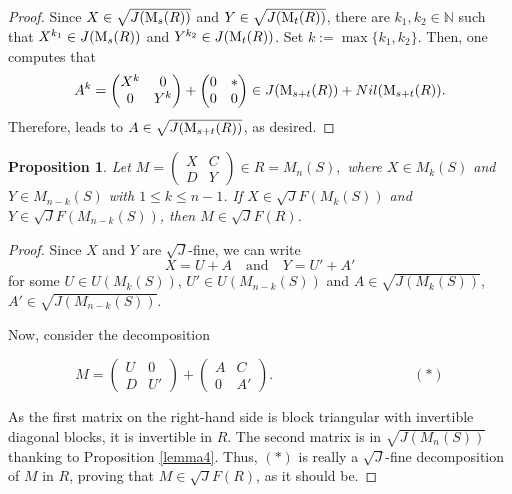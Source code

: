 \documentclass[12pt]{amsart}
\newtheorem{proposition}[theorem]{Proposition}
\theoremstyle{definition}
\begin{document}
\begin{proof}
Since $X \in \sqrt{J({\rm M}_s(R))}$ and $Y \in \sqrt{J({\rm M}_t(R))}$, there are $k_1,k_2 \in \mathbb{N}$ such that $X^{k_1} \in J({\rm M}_s(R))$ and $Y^{k_2} \in J({\rm M}_t(R))$. Set $k := \max\{k_1,k_2\}$. Then, one computes that
\[
	A^k = \begin{pmatrix} X^k & 0 \\ 0 & Y^k \end{pmatrix} + \begin{pmatrix} 0 & * \\ 0 & 0 \end{pmatrix} \in J({\rm M}_{s+t}(R)) + Nil({\rm M}_{s+t}(R)).
\]
Therefore, \cite[Lemma 2.1(8)]{DDE} leads to $A \in \sqrt{J({\rm M}_{s+t}(R))}$, as desired.
\end{proof}

\begin{proposition}\label{block}
Let
$
	M = \begin{pmatrix} X & C \\ D & Y \end{pmatrix} \in R = M_n(S),
$
where \(X \in M_k(S)\) and \(Y \in M_{n-k}(S)\) with \(1 \le k \le n-1\).
If \(X \in \sqrt{J}F(M_k(S))\) and \(Y \in \sqrt{J}F(M_{n-k}(S))\), then \(M \in \sqrt{J}F(R)\).
\end{proposition}

\begin{proof}
Since \(X\) and \(Y\) are $\sqrt{J}$-fine, we can write
	\[
	X = U + A \quad \text{and} \quad Y = U' + A'
	\]
for some \(U \in U(M_k(S))\), \(U' \in U(M_{n-k}(S))\) and \(A \in \sqrt{J(M_k(S))}\), \(A' \in \sqrt{J(M_{n-k}(S))}\).
	
Now, consider the decomposition

\[
M = \begin{pmatrix} U & 0 \\ D & U' \end{pmatrix} + \begin{pmatrix} A & C \\ 0 & A' \end{pmatrix}.
\qquad\qquad\qquad\qquad\qquad (*)
\]
	
As the first matrix on the right-hand side is block triangular with invertible diagonal blocks, it is invertible in \(R\). The second matrix is in $\sqrt{J(M_n(S))}$ thanking to Proposition \ref{lemma4}. Thus, $(*)$ is really a $\sqrt{J}$-fine decomposition of \(M\) in \(R\), proving that \(M \in \sqrt{J}F(R)\), as it should be.
\end{proof}
\end{document}
